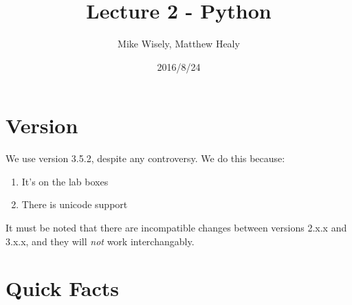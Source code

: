 \documentclass{article}
\title{Lecture 2 - Python}
\author{Mike Wisely, Matthew Healy}
\date{2016/8/24}
\begin{document}
  \maketitle

  \section{Version}

  We use version 3.5.2, despite any controversy. We do this because:
  \begin{enumerate}
    \item{It's on the lab boxes}
    \item{There is unicode support}
  \end{enumerate}

  It must be noted that there are incompatible changes between versions
  2.x.x and 3.x.x, and they will \textit{not} work interchangably.

  \section{Quick Facts}
\end{document}
